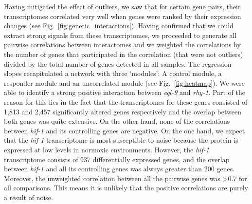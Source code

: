 \documentclass[9pt,twocolumn,twoside]{pnas-new}
\newcommand{\egl}{\emph{egl-9}}
\newcommand{\rhy}{\emph{rhy-1}}
\newcommand{\hif}{\emph{hif-1}}
\begin{document}
Having mitigated the effect of outliers, we saw that for certain gene pairs, their transcriptomes correlated very well when genes were ranked by their expression changes (see Fig.~\ref{fig:genetic_interactions}). Having confirmed that we could extract strong signals from these transcriptomes, we proceeded to generate all pairwise correlations between interactomes and we weighted the correlations by the number of genes that participated in the correlation (that were not outliers) divided by the total number of genes detected in all samples.
The regression slopes recapitulated a network with three `modules': A control module, a responder module and an uncorrelated module (see Fig.~\ref{fig:heatmap}). We were able to identify a strong positive interaction between \egl{} and \rhy{}. Part of the reason for this lies in the fact that the transcriptomes for these genes consisted of 1,813 and 2,457 significantly altered genes respectively and the overlap between both genes was quite extensive.
On the other hand, none of the correlations between \hif{} and its controlling genes are negative. On the one hand, we expect that the \hif{} transcriptome is most susceptible to noise because the protein is expressed at low levels in normoxic environments. However, the \hif{} transcriptome consists of 937 differentially expressed genes, and the overlap between \hif{} and all its controlling genes was always greater than 200 genes. Moreover, the unweighted correlation between all the pairwise genes was >0.7 for all comparisons. This means it is unlikely that the positive correlations are purely a result of noise.
\end{document}
